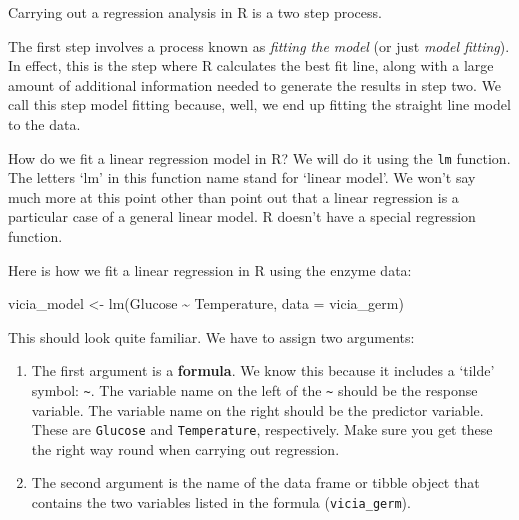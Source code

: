 \documentclass[
]{book}
\newenvironment{Shaded}{\begin{snugshade}}{\end{snugshade}}
\newcommand{\AttributeTok}[1]{\textcolor[rgb]{0.77,0.63,0.00}{#1}}
\newcommand{\FunctionTok}[1]{\textcolor[rgb]{0.00,0.00,0.00}{#1}}
\newcommand{\NormalTok}[1]{#1}
\newcommand{\OtherTok}[1]{\textcolor[rgb]{0.56,0.35,0.01}{#1}}
\newcommand{\SpecialCharTok}[1]{\textcolor[rgb]{0.00,0.00,0.00}{#1}}
\begin{document}
Carrying out a regression analysis in R is a two step process.

The first step involves a process known as \emph{fitting the model} (or just \emph{model fitting}). In effect, this is the step where R calculates the best fit line, along with a large amount of additional information needed to generate the results in step two. We call this step model fitting because, well, we end up fitting the straight line model to the data.

How do we fit a linear regression model in R? We will do it using the \texttt{lm} function. The letters `lm' in this function name stand for `linear model'. We won't say much more at this point other than point out that a linear regression is a particular case of a general linear model. R doesn't have a special regression function.

Here is how we fit a linear regression in R using the enzyme data:

\begin{Shaded}
\begin{Highlighting}[]
\NormalTok{vicia\_model }\OtherTok{\textless{}{-}} \FunctionTok{lm}\NormalTok{(Glucose }\SpecialCharTok{\textasciitilde{}}\NormalTok{ Temperature, }\AttributeTok{data =}\NormalTok{ vicia\_germ)}
\end{Highlighting}
\end{Shaded}

This should look quite familiar. We have to assign two arguments:

\begin{enumerate}
\def\labelenumi{\arabic{enumi}.}
\item
  The first argument is a \textbf{formula}. We know this because it includes a `tilde' symbol: \texttt{\textasciitilde{}}. The variable name on the left of the \texttt{\textasciitilde{}} should be the response variable. The variable name on the right should be the predictor variable. These are \texttt{Glucose} and \texttt{Temperature}, respectively. Make sure you get these the right way round when carrying out regression.
\item
  The second argument is the name of the data frame or tibble object that contains the two variables listed in the formula (\texttt{vicia\_germ}).
\end{enumerate}
\end{document}
